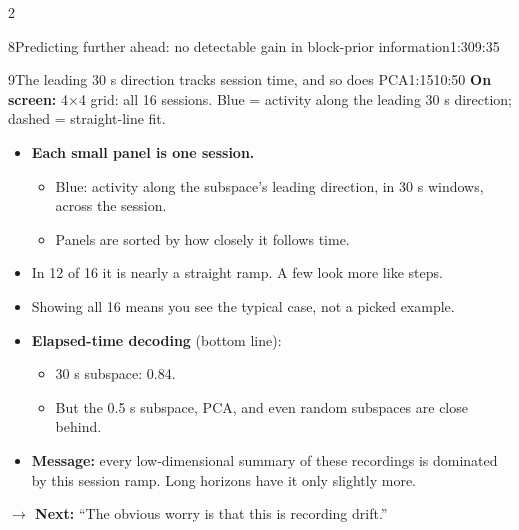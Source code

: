 \documentclass[10pt]{article}
\newcommand{\point}[1]{{\color{ink}\textbf{On screen:} #1}\par}
\newcommand{\bridge}[1]{\par{\color{accent}\textbf{$\rightarrow$ Next:} #1}\par}
\begin{document}
\begin{multicols}{2}
\begin{slidebox}{8}{Predicting further ahead: no detectable gain in block-prior information}{1:30}{9:35}
\end{slidebox}
\begin{slidebox}{9}{The leading 30 s direction tracks session time, and so does PCA}{1:15}{10:50}
\point{4$\times$4 grid: all 16 sessions. Blue = activity along the leading 30 s direction; dashed = straight-line fit.}
\begin{itemize}
\item \textbf{Each small panel is one session.}
  \begin{itemize}
  \item Blue: activity along the subspace's leading direction, in 30 s windows, across the session.
  \item Panels are sorted by how closely it follows time.
  \end{itemize}
\item In 12 of 16 it is nearly a straight ramp. A few look more like steps.
\item Showing all 16 means you see the typical case, not a picked example.
\item \textbf{Elapsed-time decoding} (bottom line):
  \begin{itemize}
  \item 30 s subspace: 0.84.
  \item But the 0.5 s subspace, PCA, and even random subspaces are close behind.
  \end{itemize}
\item \textbf{Message:} every low-dimensional summary of these recordings is dominated by this session ramp.
Long horizons have it only slightly more.
\end{itemize}
\bridge{``The obvious worry is that this is recording drift.''}


\end{slidebox}
\end{multicols}
\end{document}
